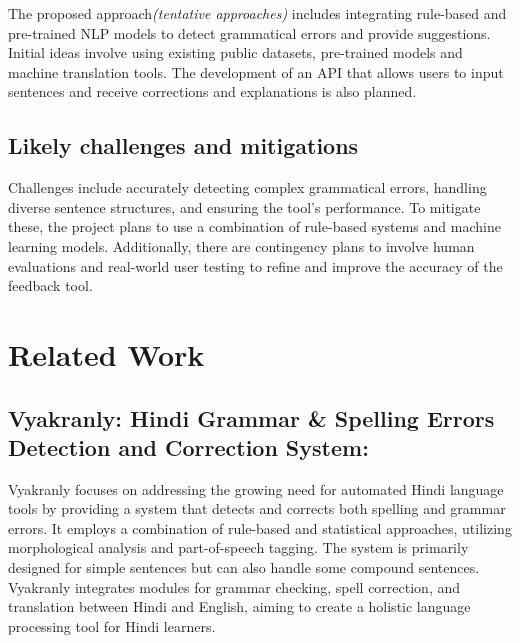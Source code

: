 \documentclass[11pt,a4paper]{article}
\begin{document}
The proposed approach\textit{(tentative approaches)} includes integrating rule-based and pre-trained NLP models to detect grammatical errors and provide suggestions. Initial ideas involve using existing public datasets, pre-trained models %
and machine translation tools. The development of an API that allows users to input sentences and receive corrections and explanations is also planned.

\subsection{Likely challenges and mitigations}
Challenges include accurately detecting complex grammatical errors, handling diverse sentence structures, and ensuring the tool's performance. To mitigate these, the project plans to use a combination of rule-based systems and machine learning models. Additionally, there are contingency plans to involve human evaluations and real-world user testing to refine and improve the accuracy of the feedback tool.
\\

\section{Related Work}
\subsection{Vyakranly: Hindi Grammar \& Spelling Errors Detection and Correction System:} 
Vyakranly focuses on addressing the growing need for automated Hindi language tools by providing a system that detects and corrects both spelling and grammar errors. It employs a combination of rule-based and statistical approaches, utilizing morphological analysis and part-of-speech tagging. The system is primarily designed for simple sentences but can also handle some compound sentences. Vyakranly integrates modules for grammar checking, spell correction, and translation between Hindi and English, aiming to create a holistic language processing tool for Hindi learners.
\end{document}
